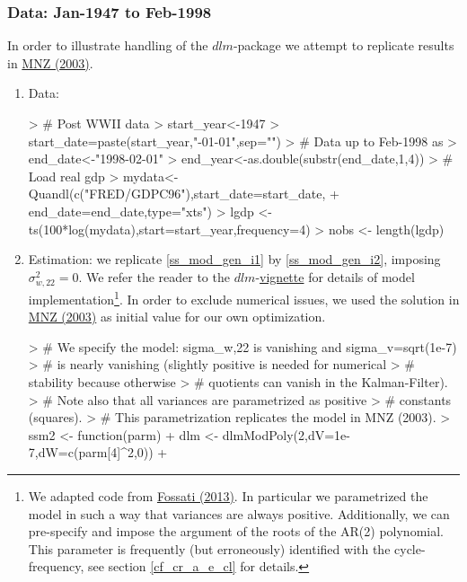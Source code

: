 \documentclass[a4paper]{book}
\begin{document}
\subsubsection{Data: Jan-1947 to Feb-1998}

In order to illustrate handling of the $dlm$-package we attempt to replicate results in \href{https://www.dropbox.com/s/1qn5h7s02c86j8i/mnz03.pdf?dl=0}{MNZ (2003)}. 

\begin{enumerate}
\item Data:
\begin{Schunk}
\begin{Sinput}
> # Post WWII data
> start_year<-1947 
> start_date=paste(start_year,"-01-01",sep="")
> # Data up to Feb-1998 as 
> end_date<-"1998-02-01"
> end_year<-as.double(substr(end_date,1,4))
> # Load real gdp
> mydata<-Quandl(c("FRED/GDPC96"),start_date=start_date,
+                end_date=end_date,type="xts")
> lgdp <- ts(100*log(mydata),start=start_year,frequency=4)
> nobs <- length(lgdp)
\end{Sinput}
\end{Schunk}
\item Estimation: we replicate \ref{ss_mod_gen_i1} by \ref{ss_mod_gen_i2}, imposing $\sigma_{w,22}^2=0$. We refer the reader to the $dlm$-\href{http://cran.r-project.org/web/packages/dlm/vignettes/dlm.pdf}{vignette} for details of model implementation\footnote{We adapted code from \href{https://www.ualberta.ca/~sfossati/e509/files/slides/lec5.r}{Fossati (2013)}. In particular we parametrized the model in such a way that variances are always positive. Additionally, we can pre-specify and impose the argument of the roots of the AR(2) polynomial. This parameter is frequently (but erroneously) identified with the cycle-frequency, see section \ref{cf_cr_a_e_cl} for details.}. In order to exclude numerical issues, we used the solution in \href{https://www.dropbox.com/s/1qn5h7s02c86j8i/mnz03.pdf?dl=0}{MNZ (2003)} as initial value for our own optimization.
\begin{Schunk}
\begin{Sinput}
> # We specify the model: sigma_{w,22} is vanishing and sigma_v=sqrt(1e-7) 
> #   is nearly vanishing (slightly positive is needed for numerical 
> #   stability because otherwise 
> #   quotients can vanish in the Kalman-Filter).
> # Note also that all variances are parametrized as positive 
> #   constants (squares).
> # This parametrization replicates the model in MNZ (2003).
> ssm2 <- function(parm){
+   dlm <- dlmModPoly(2,dV=1e-7,dW=c(parm[4]^2,0)) + 
}
\end{Sinput}
\end{Schunk}
\end{enumerate}
\end{document}
